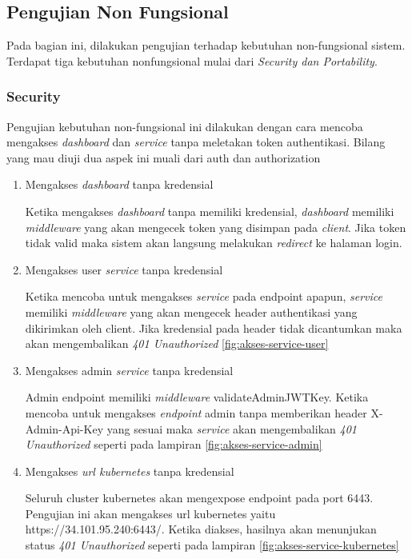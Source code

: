\subsection{Pengujian Non Fungsional}
Pada bagian ini, dilakukan pengujian terhadap kebutuhan non-fungsional sistem. Terdapat tiga kebutuhan nonfungsional mulai dari \textit{Security dan Portability}.

\subsubsection{Security}
Pengujian kebutuhan non-fungsional ini dilakukan dengan cara mencoba mengakses \textit{dashboard} dan \textit{service} tanpa meletakan token authentikasi. Bilang yang mau diuji dua aspek ini muali dari auth dan authorization

\begin{enumerate}
  \item Mengakses \textit{dashboard} tanpa kredensial

        Ketika mengakses \textit{dashboard} tanpa memiliki kredensial, \textit{dashboard} memiliki \textit{middleware} yang akan mengecek token yang disimpan pada \textit{client}. Jika token tidak valid maka sistem akan langsung melakukan \textit{redirect} ke halaman login.

  \item Mengakses user \textit{service} tanpa kredensial

        Ketika mencoba untuk mengakses \textit{service} pada endpoint apapun, \textit{service} memiliki \textit{middleware}
        yang akan mengecek header authentikasi yang dikirimkan oleh client. Jika kredensial pada header tidak dicantumkan maka akan mengembalikan \textit{401 Unauthorized} \ref{fig:akses-service-user}

  \item Mengakses admin \textit{service} tanpa kredensial

        Admin endpoint memiliki \textit{middleware} validateAdminJWTKey. Ketika mencoba untuk mengakses \textit{endpoint} admin tanpa memberikan header X-Admin-Api-Key yang sesuai maka \textit{service} akan mengembalikan \textit{401 Unauthorized} seperti pada lampiran \ref{fig:akses-service-admin}

  \item Mengakses \textit{url kubernetes} tanpa kredensial

        Seluruh cluster kubernetes akan mengexpose endpoint pada port 6443. Pengujian ini akan mengakses url kubernetes yaitu https://34.101.95.240:6443/. Ketika diakses, hasilnya akan menunjukan status \textit{401 Unauthorized} seperti pada lampiran \ref{fig:akses-service-kubernetes}

\end{enumerate}

